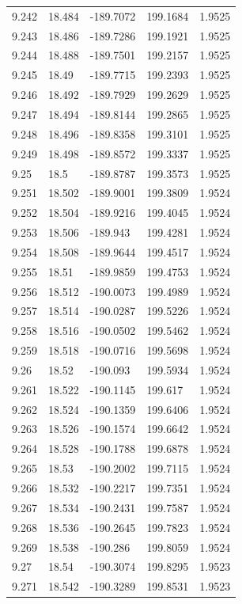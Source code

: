 \begin{tabular}{lllll}
9.242 & 18.484 & -189.7072 & 199.1684 & 1.9525 \\
9.243 & 18.486 & -189.7286 & 199.1921 & 1.9525 \\
9.244 & 18.488 & -189.7501 & 199.2157 & 1.9525 \\
9.245 & 18.49 & -189.7715 & 199.2393 & 1.9525 \\
9.246 & 18.492 & -189.7929 & 199.2629 & 1.9525 \\
9.247 & 18.494 & -189.8144 & 199.2865 & 1.9525 \\
9.248 & 18.496 & -189.8358 & 199.3101 & 1.9525 \\
9.249 & 18.498 & -189.8572 & 199.3337 & 1.9525 \\
9.25 & 18.5 & -189.8787 & 199.3573 & 1.9525 \\
9.251 & 18.502 & -189.9001 & 199.3809 & 1.9524 \\
9.252 & 18.504 & -189.9216 & 199.4045 & 1.9524 \\
9.253 & 18.506 & -189.943 & 199.4281 & 1.9524 \\
9.254 & 18.508 & -189.9644 & 199.4517 & 1.9524 \\
9.255 & 18.51 & -189.9859 & 199.4753 & 1.9524 \\
9.256 & 18.512 & -190.0073 & 199.4989 & 1.9524 \\
9.257 & 18.514 & -190.0287 & 199.5226 & 1.9524 \\
9.258 & 18.516 & -190.0502 & 199.5462 & 1.9524 \\
9.259 & 18.518 & -190.0716 & 199.5698 & 1.9524 \\
9.26 & 18.52 & -190.093 & 199.5934 & 1.9524 \\
9.261 & 18.522 & -190.1145 & 199.617 & 1.9524 \\
9.262 & 18.524 & -190.1359 & 199.6406 & 1.9524 \\
9.263 & 18.526 & -190.1574 & 199.6642 & 1.9524 \\
9.264 & 18.528 & -190.1788 & 199.6878 & 1.9524 \\
9.265 & 18.53 & -190.2002 & 199.7115 & 1.9524 \\
9.266 & 18.532 & -190.2217 & 199.7351 & 1.9524 \\
9.267 & 18.534 & -190.2431 & 199.7587 & 1.9524 \\
9.268 & 18.536 & -190.2645 & 199.7823 & 1.9524 \\
9.269 & 18.538 & -190.286 & 199.8059 & 1.9524 \\
9.27 & 18.54 & -190.3074 & 199.8295 & 1.9523 \\
9.271 & 18.542 & -190.3289 & 199.8531 & 1.9523 \\

\end{tabular}
